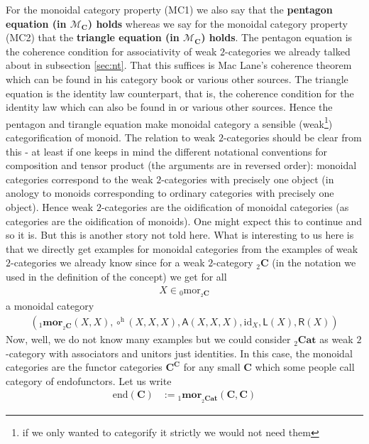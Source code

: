 For the monoidal category property (MC1) we also say that the \textbf{pentagon equation (in $\mathcal{M}_{\mathbf{C}}$) holds} whereas we say for the monoidal category property (MC2) that the \textbf{triangle equation (in $\mathcal{M}_{\mathbf{C}}$) holds}. The pentagon equation is the coherence condition for associativity of weak $2$-categories we already talked about in subsection \ref{sec:nt}. That this suffices is Mac Lane's coherence theorem which can be found in his category book \cite{e837ef86} or various other sources. The triangle equation is the identity law counterpart, that is, the coherence condition for the identity law which can also be found in \cite{e837ef86} or various other sources. Hence the pentagon and tirangle equation make monoidal category a sensible (weak\footnote{if we only wanted to categorify it strictly we would not need them}) categorification of monoid. The relation to weak $2$-categories should be clear from this - at least if one keeps in mind the different notational conventions for composition and tensor product (the arguments are in reversed order): monoidal categories correspond to the weak $2$-categories with precisely one object (in anology to monoids corresponding to ordinary categories with precisely one object). Hence weak $2$-categories are the oidification of monoidal categories (as categories are the oidification of monoids). One might expect this to continue and so it is. But this is another story not told here. What is interesting  to us here is that we directly get examples for monoidal categories from the examples of weak $2$-categories we already know since for a weak $2$-category ${}_{2}\mathbf{C}$ (in the notation we used in the definition of the concept) we get for all
\begin{align*}
  X
  \in
  {}_{0}\mathrm{mor}_{{}_{2}\mathbf{C}}
\end{align*}
a monoidal category
\begin{align*}
  \left(
    {}_{1}\mathbf{mor}_{{}_{2}\mathbf{C}}(X,X),
    \circ^{\textrm{h}}(X,X,X),
    \mathsf{A}(X,X,X),
    \mathrm{id}_{X},
    \mathsf{L}(X),
    \mathsf{R}(X)
  \right)
\end{align*}
Now, well, we do not know many examples but we could consider ${}_{2}\mathbf{Cat}$ as weak $2$-category with associators and unitors just identities. In this case, the monoidal categories are the functor categories $\mathbf{C}^{\mathbf{C}}$ for any small $\mathbf{C}$ which some people call category of endofunctors. Let us write
\begin{align*}
  \mathrm{end}(\mathbf{C})
  &:=
  {}_{1}\mathbf{mor}_{{}_{2}\mathbf{Cat}}(\mathbf{C},\mathbf{C})
\end{align*}
